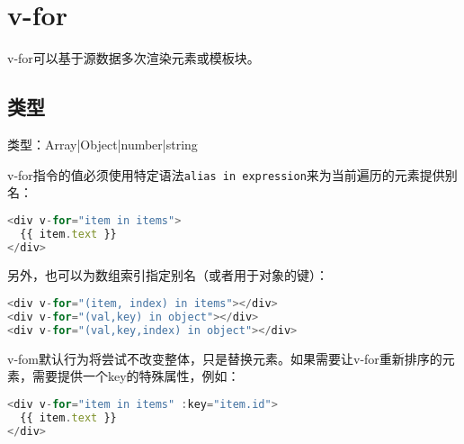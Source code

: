 \begin{lstlisting}[language=JavaScript]

\end{lstlisting}




\begin{lstlisting}[language=JavaScript]

\end{lstlisting}

\chapter{v-for}

v-for可以基于源数据多次渲染元素或模板块。

\section{类型}

\begin{compactitem}
\item 类型：Array|Object|number|string
\end{compactitem}

v-for指令的值必须使用特定语法\texttt{alias in expression}来为当前遍历的元素提供别名：


\begin{lstlisting}[language=JavaScript]
<div v-for="item in items">
  {{ item.text }}
</div>
\end{lstlisting}

另外，也可以为数组索引指定别名（或者用于对象的键）：



\begin{lstlisting}[language=JavaScript]
<div v-for="(item, index) in items"></div>
<div v-for="(val,key) in object"></div>
<div v-for="(val,key,index) in object"></div>
\end{lstlisting}

v-fom默认行为将尝试不改变整体，只是替换元素。如果需要让v-for重新排序的元素，需要提供一个key的特殊属性，例如：


\begin{lstlisting}[language=JavaScript]
<div v-for="item in items" :key="item.id">
  {{ item.text }}
</div>
\end{lstlisting}




\begin{lstlisting}[language=JavaScript]

\end{lstlisting}




